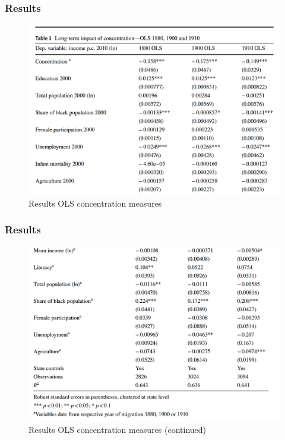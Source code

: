 \documentclass[pdftex,12pt,xcolor=pdftex,table]{beamer}
\begin{document}

\begin{frame}
\frametitle{Results}

\begin{figure}
	\begin{center}
	 \caption{\textmd{Results OLS concentration measures}}
	\includegraphics[scale=0.45]{results21.png} 
	\end{center}
\end{figure}


\end{frame}



\begin{frame}
\frametitle{Results}

\begin{figure}
	\begin{center}
	 \caption{\textmd{Results OLS concentration measures (continued)}}
	\includegraphics[scale=0.45]{results22.png} 
	\end{center}
\end{figure}


\end{frame}
\end{document}

